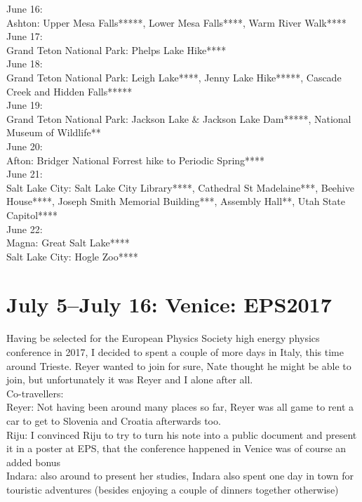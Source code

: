 June 16:\\
Ashton: Upper Mesa Falls*****, Lower Mesa Falls****, Warm River Walk****\\

June 17:\\
Grand Teton National Park: Phelps Lake Hike****\\

June 18:\\
Grand Teton National Park: Leigh Lake****, Jenny Lake Hike*****, Cascade Creek and Hidden Falls*****\\

June 19:\\
Grand Teton National Park: Jackson Lake \& Jackson Lake Dam*****, National Museum of Wildlife**\\

June 20:\\
Afton: Bridger National Forrest hike to Periodic Spring****\\

June 21:\\
Salt Lake City: Salt Lake City Library****, Cathedral St Madelaine***, Beehive House****, Joseph Smith Memorial Building***, Assembly Hall**, Utah State Capitol****\\

June 22:\\
Magna: Great Salt Lake****\\
Salt Lake City: Hogle Zoo****

\section{July 5--July 16: Venice: EPS2017}
\label{Venice2017}

Having be selected for the European Physics Society high energy physics conference in 2017, I decided to spent a couple of more days in Italy, this time around Trieste. Reyer wanted to join for sure, Nate thought he might be able to join, but unfortunately it was Reyer and I alone after all.\\

Co-travellers: \\
Reyer: Not having been around many places so far, Reyer was all game to rent a car to get to Slovenia and Croatia afterwards too.\\
Riju: I convinced Riju to try to turn his note into a public document and present it in a poster at EPS, that the conference happened in Venice was of course an added bonus\\
Indara: also around to present her studies, Indara also spent one day in town for touristic adventures (besides enjoying a couple of dinners together otherwise)\\

